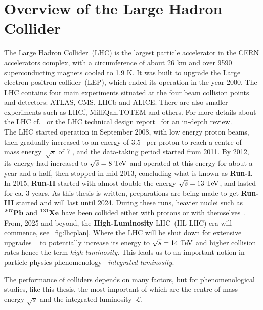 \section{Overview of the Large Hadron Collider \label{sec:theLHC}}
\par The Large Hadron Collider~(LHC) is the largest particle accelerator in the CERN accelerators complex, with a circumference of about 26 \si{\kilo\metre} and over 9590 superconducting magnets cooled to 1.9 \si{\kelvin}. It was built to upgrade the Large electron-positron collider~(LEP), which ended its operation in the year 2000. The LHC contains four main experiments situated at the four beam collision points and detectors: ATLAS, CMS, LHCb and ALICE. There are also smaller experiments such as LHCf, MilliQan,TOTEM and others. For more details about the LHC cf.~\cite{cernfacts,welt-machine} or the LHC technical design report~\cite{Bruning:2004ej} for an in-depth review.\\   The LHC started operation in September 2008, with low energy proton beams, then gradually increased to an energy of 3.5 \TeV\ per proton to reach a centre of mass energy~$\sqrt{s}$ of 7 \TeV, and the data-taking period started from 2011. By 2012, its energy had increased to $\sqrt{s}= 8\ \TeV$ and operated at this energy for about a year and a half, then stopped in mid-2013, concluding what is known as \textbf{Run-I}. In 2015,  \textbf{Run-II} started with almost double the energy $\sqrt{s}= 13\ \TeV$, and lasted for ca. 3 years. As this thesis is written, preparations are being made to get \textbf{Run-III} started and will last until 2024. During these runs, heavier nuclei such as $\prescript{207}{}{\mathbf{Pb}}$ and $\prescript{131}{}{\mathbf{Xe}}$ have been collided either with protons or with themselves~\cite{lhckomission}.  \\  From, 2025 and beyond, the \textbf{High-Luminosity} LHC~(HL-LHC) era will commence, see~\autoref{fig:lhcplan}.   Where the LHC will be shut down for extensive upgrades ~\cite{Apollinari:2015bam} to potentially increase its energy to  $\sqrt{s}= 14\ \TeV$ and higher collision rates hence the term \emph{high luminosity}. This leads us to an important notion in particle physics phenomenology ~\emph{integrated luminosity}.\\
\par The performance of colliders depends on many factors, but for phenomenological studies, like this thesis, the most important of which are the centre-of-mass energy $\sqrt{s}$ and the integrated luminosity~$\mathscr{L}$.
